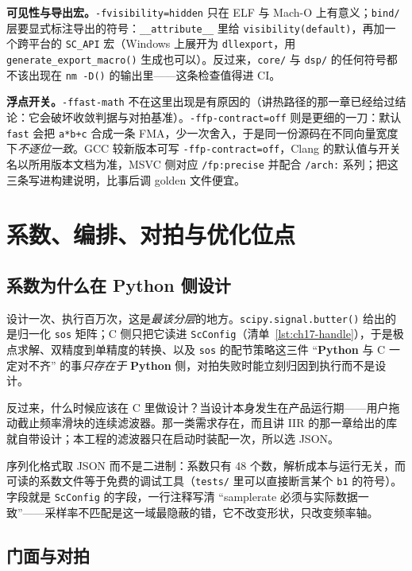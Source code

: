 \documentclass[12pt,a4paper,fontset=fandol]{ctexbook}
\newcommand{\Fn}[1]{\texttt{#1()}}
\newcommand{\Tp}[1]{\texttt{#1}}
\newcommand{\Lang}[1]{\textsf{\bfseries #1}}
\newcommand{\PY}{\Lang{Python}}
\begin{document}
\textbf{可见性与导出宏。}\Tp{-fvisibility=hidden} 只在 ELF 与 Mach-O 上有意义；\Tp{bind/} 层要显式标注导出的符号：\Tp{\_\_attribute\_\_} 里给 \Tp{visibility(\textquotedbl default\textquotedbl)}，再加一个跨平台的 \Tp{SC\_API} 宏（Windows 上展开为 \Tp{dllexport}，用 \Fn{generate\_export\_macro} 生成也可以）。反过来，\Tp{core/} 与 \Tp{dsp/} 的任何符号都不该出现在 \Fn{nm -D} 的输出里——这条检查值得进 CI。

\textbf{浮点开关。}\Tp{-ffast-math} 不在这里出现是有原因的（讲热路径的那一章已经给过结论：它会破坏收敛判据与对拍基准）。\Tp{-ffp-contract=off} 则是更细的一刀：默认 \Tp{fast} 会把 \Tp{a*b+c} 合成一条 FMA，少一次舍入，于是同一份源码在不同向量宽度下\emph{不逐位一致}。GCC 较新版本可写 \Tp{-ffp-contract=off}，Clang 的默认值与开关名以所用版本文档为准，MSVC 侧对应 \Tp{/fp:precise} 并配合 \Tp{/arch:} 系列；把这三条写进构建说明，比事后调 golden 文件便宜。

\section{系数、编排、对拍与优化位点}

\subsection{系数为什么在 \PY{} 侧设计}

设计一次、执行百万次，这是\emph{最该分层}的地方。\Fn{scipy.signal.butter} 给出的是归一化 \Tp{sos} 矩阵；C 侧只把它读进 \Tp{ScConfig}（清单~\ref{lst:ch17-handle}），于是极点求解、双精度到单精度的转换、以及 \Tp{sos} 的配节策略这三件 ``\PY{} 与 C 一定对不齐'' 的事\emph{只存在于} \PY{} 侧，对拍失败时能立刻归因到执行而不是设计。

反过来，什么时候应该在 C 里做设计？当设计本身发生在产品运行期——用户拖动截止频率滑块的连续滤波器。那一类需求存在，而且讲 IIR 的那一章给出的库就自带设计；本工程的滤波器只在启动时装配一次，所以选 JSON。

序列化格式取 JSON 而不是二进制：系数只有 48 个数，解析成本与运行无关，而可读的系数文件等于免费的调试工具（\Tp{tests/} 里可以直接断言某个 \Tp{b1} 的符号）。字段就是 \Tp{ScConfig} 的字段，一行注释写清 ``samplerate 必须与实际数据一致''——采样率不匹配是这一域最隐蔽的错，它不改变形状，只改变频率轴。

\subsection{门面与对拍}
\end{document}
